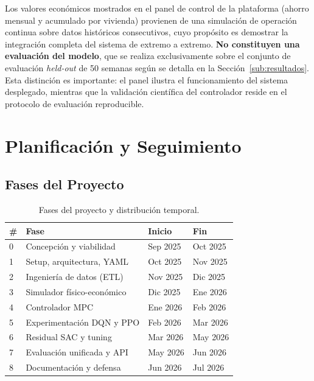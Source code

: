 \documentclass[12pt, a4paper, twoside]{report}
\begin{document}
Los valores económicos mostrados en el panel de control de la plataforma (ahorro
mensual y acumulado por vivienda) provienen de una simulación de operación
continua sobre datos históricos consecutivos, cuyo propósito es demostrar la
integración completa del sistema de extremo a extremo. \textbf{No constituyen
una evaluación del modelo}, que se realiza exclusivamente sobre el conjunto de
evaluación \textit{held-out} de 50 semanas según se detalla en la
Sección~\ref{sub:resultados}. Esta distinción es importante: el panel ilustra el
funcionamiento del sistema desplegado, mientras que la validación científica del
controlador reside en el protocolo de evaluación reproducible.

\chapter{Planificación y Seguimiento}
\label{chap:planificacion}

\section{Fases del Proyecto}

\begin{table}[H]
\centering
\caption{Fases del proyecto y distribución temporal.}
\label{tab:fases}
\begin{tabularx}{\textwidth}{C{0.5cm}L{4.2cm}C{1.8cm}C{1.8cm}}
\toprule
\textbf{\#} & \textbf{Fase} & \textbf{Inicio} & \textbf{Fin} \\
 & Concepción y viabilidad & Sep 2025 & Oct 2025 \\
1 & Setup, arquitectura, YAML & Oct 2025 & Nov 2025 \\
2 & Ingeniería de datos (ETL) & Nov 2025 & Dic 2025 \\
3 & Simulador físico-económico & Dic 2025 & Ene 2026 \\
4 & Controlador MPC & Ene 2026 & Feb 2026 \\
5 & Experimentación DQN y PPO & Feb 2026 & Mar 2026 \\
6 & Residual SAC y tuning & Mar 2026 & May 2026 \\
7 & Evaluación unificada y API & May 2026 & Jun 2026 \\
8 & Documentación y defensa & Jun 2026 & Jul 2026 \\
\bottomrule
\end{tabularx}
\end{table}
\end{document}
